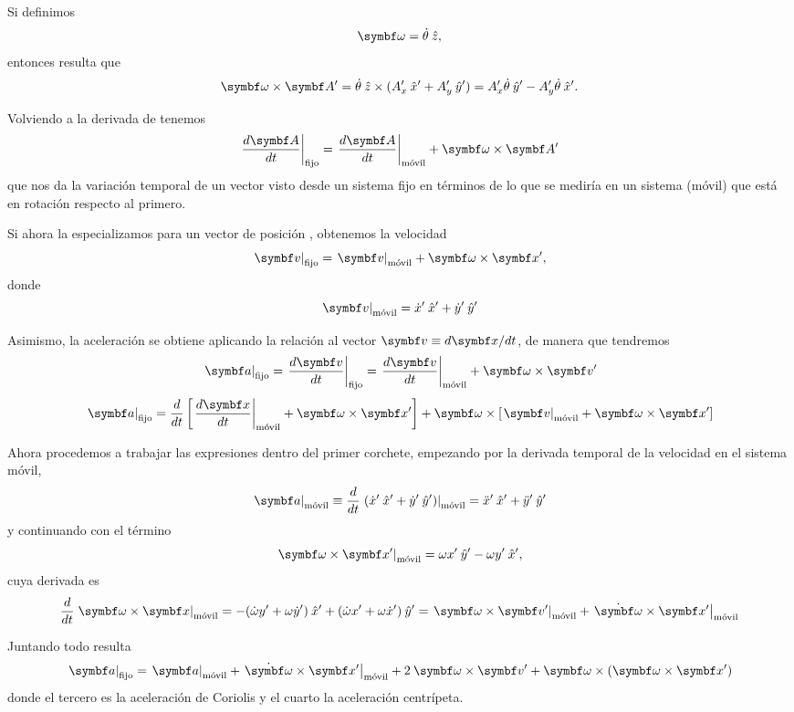 \documentclass[10pt,oneside]{CBFT_book}
\begin{document}
Si definimos
\[
	\vb{\omega} = \dot{\theta} \zver,
\]
entonces resulta que
\[
	\vb{\omega}\times\vb{A}' = \dot{\theta} \zver \times ({A_x'}\xver' + {A_y'}\yver') =
	A_x' \dot{\theta}\yver' - A_y'\dot{\theta}\xver'.
\]

Volviendo a la derivada de  tenemos
\[
	\left. \dtot{\vb{A}}{t} \right|_\text{fijo} = \left. \dtot{\vb{A}}{t} \right|_\text{móvil}
	+ \vb{\omega} \times \vb{A}'
\]
que nos da la variación temporal de un vector  visto desde un sistema fijo en términos de lo que se mediría
en un sistema (móvil) que está en rotación respecto al primero.

Si ahora la especializamos para un vector de posición , obtenemos la velocidad  
\[
	\left. \vb{v} \right|_\text{fijo} = \left. \vb{v} \right|_\text{móvil} + \vb{\omega} \times \vb{x}',
\]
donde 
\[
	\left. \vb{v} \right|_\text{móvil} = \dot{x}' \xver' + \dot{y}' \yver' 
\]

Asimismo, la aceleración se obtiene aplicando la relación al vector $\vb{v} \equiv d\vb{x}/dt$, de manera que 
tendremos
\[
	\left. \vb{a} \right|_\text{fijo} = \left. \dtot{\vb{v}}{t} \right|_\text{fijo} = \left. \dtot{\vb{v}}{t} \right|_\text{móvil} +
	\vb{\omega} \times \vb{v}'
\]
\[
	\left. \vb{a} \right|_\text{fijo} = 
	\dtot{}{t}\left[ \left. \dtot{\vb{x}}{t} \right|_\text{móvil} + \vb{\omega}\times\vb{x}' \right] +
	\vb{\omega} \times \left[ \left. \vb{v} \right|_\text{móvil} +	\vb{\omega}\times\vb{x}' \right]
\]

Ahora procedemos a trabajar las expresiones dentro del primer corchete, empezando por la derivada temporal de la velocidad
en el sistema móvil,
\[
	\left. \vb{a} \right|_\text{móvil} \equiv  
	\dtot{}{t}\left.( \dot{x}' \xver' + \dot{y}' \yver' )\right|_\text{móvil} = \ddot{x}' \xver' + \ddot{y}' \yver'
\]
y continuando con el término 
\[
	\left.\vb{\omega}\times\vb{x}'\right|_\text{móvil} = \omega x' \yver' - \omega y' \xver' ,
\]
cuya derivada es
\[
	\dtot{}{t}\left.\vb{\omega}\times\vb{x}\right|_\text{móvil} = 
	-( \dot{\omega} y' + \omega \dot{y}' )\xver' + ( \dot{\omega} x' + \omega \dot{x}' )\yver' =
	\left. \vb{\omega} \times\vb{v}'\right|_\text{móvil} + \left.\dot{\vb{\omega}} \times\vb{x}'\right|_\text{móvil}
\]

Juntando todo resulta
\[
	\left. \vb{a}\right|_\text{fijo} = \left. \vb{a}\right|_\text{móvil} 
	+ \left.\dot{\vb{\omega}} \times\vb{x}'\right|_\text{móvil} + 2 \:\vb{\omega}\times\vb{v'} + \vb{\omega}
	\times (\vb{\omega} \times \vb{x}')
\]
donde el tercero es la aceleración de Coriolis y el cuarto la aceleración centrípeta.
\end{document}

